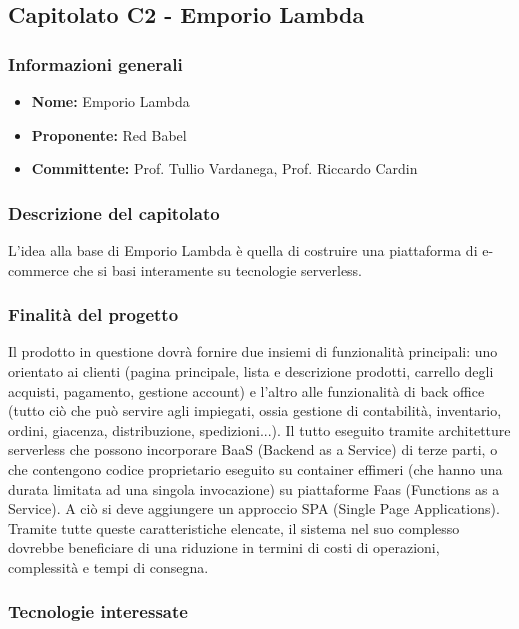 \subsection{Capitolato C2 - Emporio Lambda}


\subsubsection{Informazioni generali}

\begin{itemize}
	\item{\textbf{Nome:}} Emporio Lambda
	\item{\textbf{Proponente:}} Red Babel
	\item{\textbf{Committente:}} Prof. Tullio Vardanega, Prof. Riccardo Cardin
\end{itemize}



\subsubsection{Descrizione del capitolato}

L'idea alla base di Emporio Lambda è quella di costruire una piattaforma di e-commerce che si basi interamente su tecnologie serverless.


\subsubsection{Finalità del progetto}

Il prodotto in questione dovrà fornire due insiemi di funzionalità principali: uno orientato ai clienti (pagina principale, lista e descrizione prodotti, carrello degli acquisti, pagamento, gestione account) e l'altro alle funzionalità di back office (tutto ciò che può servire agli impiegati, ossia gestione di contabilità, inventario, ordini, giacenza, distribuzione, spedizioni...).
Il tutto eseguito tramite architetture serverless che possono incorporare BaaS (Backend as a Service) di terze parti, o che contengono codice proprietario eseguito su container effimeri (che hanno una durata limitata ad una singola invocazione) su piattaforme Faas (Functions as a Service). A ciò si deve aggiungere un approccio SPA (Single Page Applications). Tramite tutte queste caratteristiche elencate, il sistema nel suo complesso dovrebbe beneficiare di una riduzione in termini di costi di operazioni, complessità e tempi di consegna.


\subsubsection{Tecnologie interessate}

